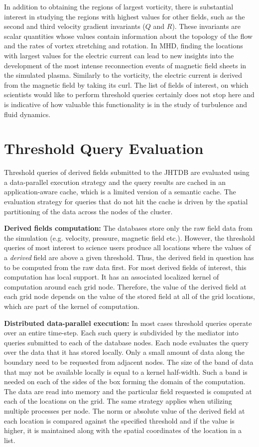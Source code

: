 \documentclass{sig-alternate}
\begin{document}
In addition to obtaining the regions of largest vorticity, there is substantial interest in studying the regions with highest values for other fields, such as
the second and third velocity gradient invariants ($Q$ and $R$). These invariants are scalar quantities whose values contain information about the 
topology of the flow and the rates of vortex stretching and rotation. In MHD, finding the locations with largest values for the electric current
can lead to new insights into the development of the most intense reconnection events of magnetic field sheets in the simulated plasma. Similarly to
the vorticity, the electric current is derived from the magnetic field by taking its curl. The list of fields of interest, on which scientists would like to perform 
threshold queries certainly does not stop here and is indicative of how valuable this functionality is in the study of turbulence and fluid dynamics.

\section{Threshold Query Evaluation}

Threshold queries of derived fields submitted to the JHTDB are evaluated using a data-parallel execution strategy and the query results are 
cached in an application-aware cache, which is a limited version of a semantic cache. 
The evaluation strategy for queries that do not hit the cache is driven by the spatial partitioning of the data across the nodes of the cluster.

{\bf Derived fields computation:} The databases store only the raw field data from the simulation (e.g. velocity, pressure, magnetic field etc.). However,
the threshold queries of most interest to science users produce all locations where the values of a \emph{derived} field are above a given threshold. Thus, the
derived field in question has to be computed from the raw data first. For most derived fields of interest, this computation has local support. It has an 
associated localized kernel of computation around each grid node. Therefore, the value of the derived field at each grid node depends on the value of the
stored field at all of the grid locations, which are part of the kernel of computation. 

{\bf Distributed data-parallel execution:} In most cases threshold queries operate over an entire time-step. Each such query is subdivided by 
the mediator into queries submitted to
each of the database nodes. Each node evaluates the query over the data that it has stored locally. Only a small amount of data along the boundary
need to be requested from adjacent nodes. The size of the band of data that may not be available locally is equal to a kernel half-width. 
Such a band is needed on each of the sides of the box forming the domain of the computation.  
The data are read into memory and the particular field requested is computed at each of the locations on
the grid. The same strategy applies when utilizing multiple processes per node. The norm or absolute value of the derived field at each location is compared 
against the specified threshold and if the value is higher, it is maintained along with
the spatial coordinates of the location in a list.
\end{document}
